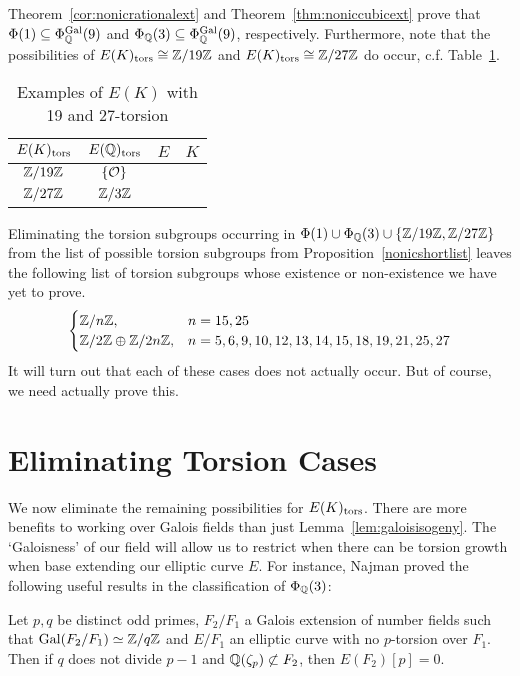 Theorem~\ref{cor:nonicrationalext} and Theorem~\ref{thm:noniccubicext} prove that $\Phi(1) \subseteq \Phi_{\mathbb{Q}}^{\operatorname{Gal}}(9)$ and $\Phi_{\mathbb{Q}}(3) \subseteq \Phi_{\mathbb{Q}}^{\operatorname{Gal}}(9)$, respectively. Furthermore, note that the possibilities of $E(K)_{\text{tors}} \cong \mathbb{Z}/19\mathbb{Z}$ and $E(K)_{\text{tors}} \cong \mathbb{Z}/27\mathbb{Z}$ do occur, c.f. Table~\ref{tab:1927tor}.

        \begin{table}[!ht]
        \centering
        \caption{Examples of $E(K)$ with 19 and 27-torsion\label{tab:1927tor}}
        \begin{tabular}{cccc} \hline
        $E(K)_{\text{tors}}$ & $E(\mathbb{Q})_{\text{tors}}$ &  $E$ & $K$ \\ \hline
        $\mathbb{Z}/19\mathbb{Z}$ & $\{ \mathcal{O} \}$ & \tsoao{} & \qzetantp{} \\ 
        $\mathbb{Z}/27\mathbb{Z}$ & $\mathbb{Z}/3\mathbb{Z}$ & \tsaf{} & \qzetatsp{}
        \end{tabular}
        \end{table}


Eliminating the torsion subgroups occurring in $\Phi(1) \cup \Phi_{\mathbb{Q}}(3) \cup \{ \mathbb{Z}/19\mathbb{Z}, \mathbb{Z}/27\mathbb{Z} \}$ from the list of possible torsion subgroups from Proposition~\ref{nonicshortlist} leaves the following list of torsion subgroups whose existence or non-existence we have yet to prove. 
	\[
	\begin{cases}
	\mathbb{Z}/n\mathbb{Z}, & n= 15, 25 \\
	\mathbb{Z}/2\mathbb{Z} \oplus \mathbb{Z}/2n\mathbb{Z}, & n= 5, 6, 9, 10, 12, 13, 14, 15, 18, 19, 21, 25, 27
	\end{cases}
	\]
It will turn out that each of these cases does not actually occur. But of course, we need actually prove this. 





\section{Eliminating Torsion Cases\label{sec:nonicelim}}

We now eliminate the remaining possibilities for $E(K)_{\text{tors}}$. There are more benefits to working over Galois fields than just Lemma~\ref{lem:galoisisogeny}. The `Galoisness' of our field will allow us to restrict when there can be torsion growth when base extending our elliptic curve $E$. For instance, Najman proved the following useful results in the classification of $\Phi_{\mathbb{Q}}(3)$:


\begin{lem} \label{najmangrow1}
Let $p, q$ be distinct odd primes, $F_2/F_1$ a Galois extension of number fields such that $\operatorname{Gal}(F_2/F_1) \simeq \mathbb{Z}/q\mathbb{Z}$ and $E/F_1$ an elliptic curve with no $p$-torsion over $F_1$. Then if $q$ does not divide $p-1$ and $\mathbb{Q}(\zeta_p) \not\subset F_2$, then $E(F_2)[p]=0$. 
\end{lem}


